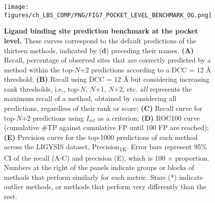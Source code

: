 \begin{figure}[ht!]
    \centering
    \texttt{[image: figures/ch\_LBS\_COMP/PNG/FIG7\_POCKET\_LEVEL\_BENCHMARK\_OG.png]}
    \caption[Ligand binding site prediction benchmark at the pocket level]{\textbf{Ligand binding site prediction benchmark at the pocket level.} These curves correspond to the default predictions of the thirteen methods,
indicated by (\textbf{d}) preceding their names. \textbf{(A)} Recall, percentage of observed sites that are correctly predicted by a method within the top-$N$+2 predictions according to a DCC = 12 \AA{} threshold; \textbf{(B)} Recall using DCC = 12 \AA{} but considering increasing rank thresholds, i.e., top-$N$, $N$+1, $N$+2, etc. \textit{all} represents the maximum recall of a method, obtained by considering all predictions, regardless of their rank or score; \textbf{(C)} Recall curve for top-$N$+2 predictions using $I_{rel}$ as a criterion; \textbf{(D)} ROC100 curve (cumulative \#TP against cumulative FP until 100 FP are reached); \textbf{(E)} Precision curve for the top-1000 predictions of each method across the LIGYSIS dataset, Precision\textsubscript{1K}. Error bars represent 95\% CI of the recall (A-C) and precision (E), which is 100 $\times$ proportion. Numbers at the right of the panels indicate groups or blocks of methods that perform similarly for each metric. Stars (*) indicate outlier methods, or methods that perform very differently than the rest.}
    \label{fig:pocket_level_benchmark_OG}
\end{figure}

